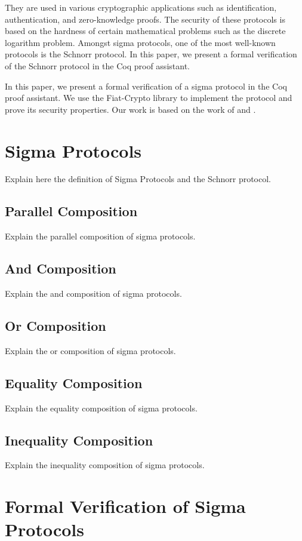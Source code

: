 \documentclass[sigconf]{acmart}
\begin{document}
They are used in various cryptographic 
applications such as identification, authentication, and zero-knowledge proofs. 
The security of these protocols is based on the hardness of certain mathematical 
problems such as the discrete logarithm problem. Amongst sigma protocols, 
one of the most well-known protocols is the Schnorr protocol. In this 
paper, we present a formal verification of the Schnorr protocol in the
Coq proof assistant. 

In this paper, we present a 
formal verification of a sigma protocol in the Coq proof assistant. We use 
the Fiat-Crypto library to implement the protocol and prove its security 
properties. Our work is based on the work of \cite{fiat-crypto} and \cite{pok}.

\section{Sigma Protocols}

  Explain here the definition of Sigma Protocols and the Schnorr protocol. 

  \subsection{Parallel Composition}
  Explain the parallel composition of sigma protocols.

  \subsection{And Composition}
  Explain the and composition of sigma protocols.

  \subsection{Or Composition}
  Explain the or composition of sigma protocols.

  \subsection{Equality Composition}
  Explain the equality composition of sigma protocols.

  \subsection{Inequality Composition}
  Explain the inequality composition of sigma protocols.

\section{Formal Verification of Sigma Protocols}
\end{document}
